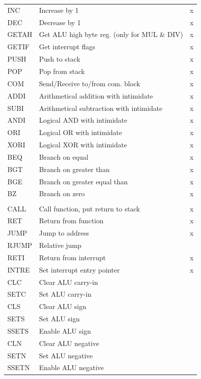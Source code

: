 \documentclass[a4paper,12pt]{article}
\begin{document}
\begin{longtable}{| l | p{} | c |}
	INC  & Increase by 1 & x \\
	DEC  & Decrease by 1  & x \\
	GETAH& Get ALU high byte reg. (only for MUL \& DIV) & x \\
	GETIF& Get interrupt flags & x \\\hline
		
	PUSH & Push to stack & x \\
	POP  & Pop from stack & x \\
	COM  & Send/Receive to/from com. block & x \\\hline
	
	ADDI & Arithmetical addition with intimidate & x \\
	SUBI & Arithmetical subtraction with intimidate & x \\
	ANDI & Logical AND with intimidate & x \\
	ORI  & Logical OR with intimidate & x \\
	XORI & Logical XOR with intimidate & x \\\hline
	
	BEQ  & Branch on equal & x \\
	BGT  & Branch on greater than & x \\
	BGE  & Branch on greater equal than & x \\
	BZ   & Branch on zero & x \\
		
	\arrayrulecolor{black}\hline
	\multicolumn{3}{|c|}{
	\cellcolor[rgb]{0.7,0.7,1}\textit{0 register instructions}
	} \\
	\hline\arrayrulecolor[rgb]{0.82,0.82,0.82} 
	
	CALL & Call function, put return to stack & x \\
	RET  & Return from function & x \\
	JUMP & Jump to address & x \\
	RJUMP& Relative jump & \\\hline
	RETI & Return from interrupt & x \\
	INTRE& Set interrupt entry pointer & x \\\hline
	
	CLC  & Clear ALU carry-in & \\
	SETC & Set ALU carry-in & \\
	CLS  & Clear ALU sign & \\
	SETS & Set ALU sign & \\
	SSETS& Enable ALU sign & \\
	CLN  & Clear ALU negative & \\
	SETN & Set ALU negative & \\
	SSETN& Enable ALU negative & \\
\end{longtable}
\end{document}
